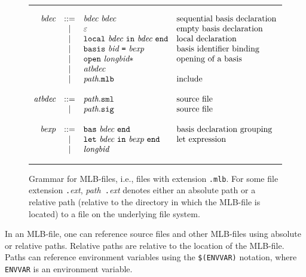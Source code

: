 \documentclass[12pt]{book}
\begin{document}
\begin{figure}
\hrule\medskip
\[
\begin{array}{rcll}
  \emph{bdec} & ::= & \emph{bdec}~ \emph{bdec} & \mbox{sequential~basis~declaration} \\
            & |   & \varepsilon & \mbox{empty~basis~declaration} \\
            & |   & \texttt{local}~ \emph{bdec}~\texttt{in}~\emph{bdec}~\texttt{end} & \mbox{local~declaration} \\
            & |   & \texttt{basis} ~\emph{bid}~\texttt{=}~\emph{bexp} & \mbox{basis~identifier~binding} \\
            & |   & \texttt{open} ~\emph{longbid}* & \mbox{opening~of~a~basis}\\
            & |   & \emph{atbdec} \\
            & |   & \emph{path}.\texttt{mlb} & \mbox{include} \\ \\
  \emph{atbdec} & ::= & \emph{path}.\texttt{sml} & \mbox{source~file} \\
              & |   & \emph{path}.\texttt{sig} & \mbox{source~file} \\ \\
  \emph{bexp} & ::= & \texttt{bas}~ \emph{bdec}~ \texttt{end} & \mbox{basis~declaration~grouping} \\
            & |   & \texttt{let}~\emph{bdec}~\texttt{in}~\emph{bexp}~\texttt{end} & \mbox{let~expression} \\
            & |   & \emph{longbid}
\end{array}
\]
\caption{Grammar for MLB-files, i.e., files with extension {\tt .mlb}.
  For some file extension {\tt .}\emph{ext}, {\it path}{\tt
    .}\emph{ext} denotes either an absolute path or a relative path
  (relative to the directory in which the MLB-file is located) to a
  file on the underlying file system.}
\label{mlb_grammar.fig}
\medskip \hrule
\end{figure}
In an MLB-file, one can reference source files and other MLB-files
using absolute or relative
%
%
paths.  Relative paths are relative to the location of the MLB-file.
Paths can reference environment variables using the
\texttt{\$(ENVVAR)} notation, where \texttt{ENVVAR} is an environment
variable.
\end{document}
